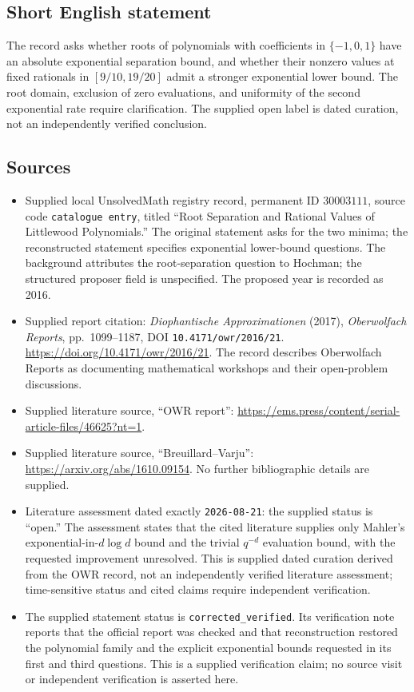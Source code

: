 \documentclass[11pt]{article}
\begin{document}
\subsection{Short English statement}
The record asks whether roots of polynomials with coefficients in \(\{-1,0,1\}\) have an absolute exponential separation bound, and whether their nonzero values at fixed rationals in \([9/10,19/20]\) admit a stronger exponential lower bound. The root domain, exclusion of zero evaluations, and uniformity of the second exponential rate require clarification. The supplied open label is dated curation, not an independently verified conclusion.
\subsection{Sources}
\begin{itemize}
\item Supplied local UnsolvedMath registry record, permanent ID \(30003111\), source code \texttt{catalogue entry}, titled ``Root Separation and Rational Values of Littlewood Polynomials.'' The original statement asks for the two minima; the reconstructed statement specifies exponential lower-bound questions. The background attributes the root-separation question to Hochman; the structured proposer field is unspecified. The proposed year is recorded as 2016.
\item Supplied report citation: \emph{Diophantische Approximationen} (2017), \emph{Oberwolfach Reports}, pp.\ 1099--1187, DOI \texttt{10.4171/owr/2016/21}. \url{https://doi.org/10.4171/owr/2016/21}. The record describes Oberwolfach Reports as documenting mathematical workshops and their open-problem discussions.
\item Supplied literature source, ``OWR report'': \url{https://ems.press/content/serial-article-files/46625?nt=1}.
\item Supplied literature source, ``Breuillard--Varju'': \url{https://arxiv.org/abs/1610.09154}. No further bibliographic details are supplied.
\item Literature assessment dated exactly \texttt{2026-08-21}: the supplied status is ``open.'' The assessment states that the cited literature supplies only Mahler's exponential-in-\(d\log d\) bound and the trivial \(q^{-d}\) evaluation bound, with the requested improvement unresolved. This is supplied dated curation derived from the OWR record, not an independently verified literature assessment; time-sensitive status and cited claims require independent verification.
\item The supplied statement status is \texttt{corrected\_verified}. Its verification note reports that the official report was checked and that reconstruction restored the polynomial family and the explicit exponential bounds requested in its first and third questions. This is a supplied verification claim; no source visit or independent verification is asserted here.
\end{itemize}
\end{document}
